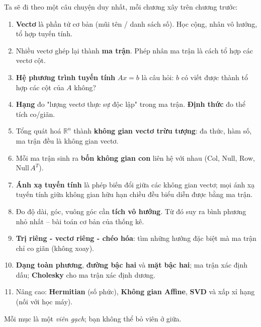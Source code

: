 \documentclass[12pt,a4paper]{article}
\begin{document}
\begin{ynghia}
Ta sẽ đi theo một câu chuyện duy nhất, mỗi chương xây trên chương trước:

\begin{enumerate}
  \item[\textbf{I.}] \textbf{Vectơ} là phần tử cơ bản (mũi tên / danh sách số). Học cộng, nhân vô hướng, tổ hợp tuyến tính.
  \item[\textbf{II.}] Nhiều vectơ ghép lại thành \textbf{ma trận}. Phép nhân ma trận là cách tổ hợp các vectơ cột.
  \item[\textbf{III.}] \textbf{Hệ phương trình tuyến tính} $Ax = b$ là câu hỏi: $b$ có viết được thành tổ hợp các cột của $A$ không?
  \item[\textbf{IV.}] \textbf{Hạng} đo "lượng vectơ thực sự độc lập" trong ma trận. \textbf{Định thức} đo thể tích co/giãn.
  \item[\textbf{V.}] Tổng quát hoá $\mathbb{R}^n$ thành \textbf{không gian vectơ trừu tượng}: đa thức, hàm số, ma trận đều là không gian vectơ.
  \item[\textbf{VI.}] Mỗi ma trận sinh ra \textbf{bốn không gian con} liên hệ với nhau (Col, Null, Row, $\mathrm{Null}\,A^T$).
  \item[\textbf{VII.}] \textbf{Ánh xạ tuyến tính} là phép biến đổi giữa các không gian vectơ; mọi ánh xạ tuyến tính giữa không gian hữu hạn chiều đều biểu diễn được bằng ma trận.
  \item[\textbf{VIII.}] Đo độ dài, góc, vuông góc cần \textbf{tích vô hướng}. Từ đó suy ra bình phương nhỏ nhất -- bài toán cơ bản của thống kê.
  \item[\textbf{IX.}] \textbf{Trị riêng - vectơ riêng - chéo hóa}: tìm những hướng đặc biệt mà ma trận chỉ co giãn (không xoay).
  \item[\textbf{X.}] \textbf{Dạng toàn phương}, \textbf{đường bậc hai} và \textbf{mặt bậc hai}; ma trận xác định dấu; \textbf{Cholesky} cho ma trận xác định dương.
  \item[\textbf{XI.}] Nâng cao: \textbf{Hermitian} (số phức), \textbf{Không gian Affine}, \textbf{SVD} và xấp xỉ hạng (nối với học máy).
\end{enumerate}

Mỗi mục là một \emph{viên gạch}; bạn không thể bỏ viên ở giữa.
\end{ynghia}

\newpage

\end{document}
